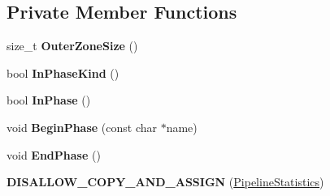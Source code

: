 \subsection*{Private Member Functions}
\begin{DoxyCompactItemize}
\item 
size\+\_\+t {\bfseries Outer\+Zone\+Size} ()\hypertarget{classv8_1_1internal_1_1compiler_1_1_pipeline_statistics_ae7e4bf32f53fa6be2ad6819aabac32c8}{}\label{classv8_1_1internal_1_1compiler_1_1_pipeline_statistics_ae7e4bf32f53fa6be2ad6819aabac32c8}

\item 
bool {\bfseries In\+Phase\+Kind} ()\hypertarget{classv8_1_1internal_1_1compiler_1_1_pipeline_statistics_ad6dbf96168d45ee87727d4dbdaac6907}{}\label{classv8_1_1internal_1_1compiler_1_1_pipeline_statistics_ad6dbf96168d45ee87727d4dbdaac6907}

\item 
bool {\bfseries In\+Phase} ()\hypertarget{classv8_1_1internal_1_1compiler_1_1_pipeline_statistics_a0226cd07a42fcbf8e4af2d94420ba75b}{}\label{classv8_1_1internal_1_1compiler_1_1_pipeline_statistics_a0226cd07a42fcbf8e4af2d94420ba75b}

\item 
void {\bfseries Begin\+Phase} (const char $\ast$name)\hypertarget{classv8_1_1internal_1_1compiler_1_1_pipeline_statistics_aa97cc6b66403257ac2eb9fd064da9a2d}{}\label{classv8_1_1internal_1_1compiler_1_1_pipeline_statistics_aa97cc6b66403257ac2eb9fd064da9a2d}

\item 
void {\bfseries End\+Phase} ()\hypertarget{classv8_1_1internal_1_1compiler_1_1_pipeline_statistics_a634b85770a93582ddb84914a474f7244}{}\label{classv8_1_1internal_1_1compiler_1_1_pipeline_statistics_a634b85770a93582ddb84914a474f7244}

\item 
{\bfseries D\+I\+S\+A\+L\+L\+O\+W\+\_\+\+C\+O\+P\+Y\+\_\+\+A\+N\+D\+\_\+\+A\+S\+S\+I\+GN} (\hyperlink{classv8_1_1internal_1_1compiler_1_1_pipeline_statistics}{Pipeline\+Statistics})\hypertarget{classv8_1_1internal_1_1compiler_1_1_pipeline_statistics_a159ff99defc34336bd5bbf95ad24cb88}{}\label{classv8_1_1internal_1_1compiler_1_1_pipeline_statistics_a159ff99defc34336bd5bbf95ad24cb88}

\end{DoxyCompactItemize}

